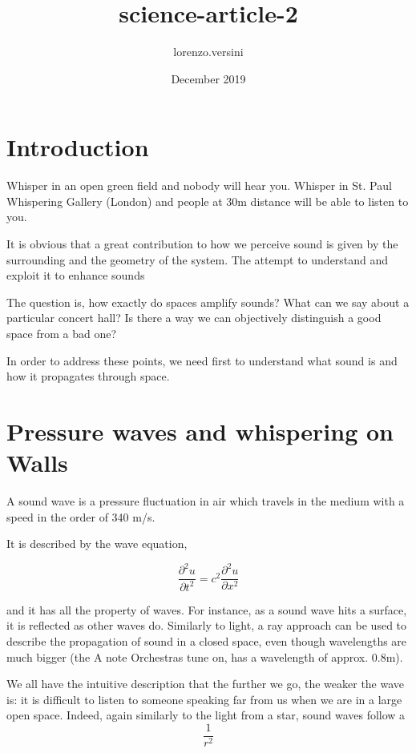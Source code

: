 \documentclass[draft ]{article}
\title{science-article-2}
\author{lorenzo.versini }
\date{December 2019}
\begin{document}
\twocolumn
\maketitle

\section{Introduction}


Whisper in an open green field and nobody will hear you. Whisper in St. Paul Whispering Gallery (London) and people at 30m distance will be able to listen to you.

It is obvious that a great contribution to how we perceive sound is given by the surrounding and the geometry of the system. The attempt to understand and exploit it to enhance sounds 

The question is, how exactly do spaces amplify sounds? What can we say about a particular concert hall? Is there a way we can objectively distinguish a good space from a bad one?

In order to address these points, we need first to understand what sound is and how it propagates through space.

\section{Pressure waves and whispering on Walls}

A sound wave is a pressure fluctuation in air \cite{book:university_physics} which travels in the medium with a speed in the order of 340 m/s.

It is described by the wave equation,

\begin{equation}
\frac{\partial^2 u}{\partial t^2} = c^2 \frac{\partial^2 u}{\partial x^2}
\end{equation}

and it has all the property of waves.
For instance, as a sound wave hits a surface, it is reflected as other waves do. Similarly to light, a ray approach can be used to describe the propagation of sound in a closed space, even though wavelengths are much bigger (the A note Orchestras tune on, has a wavelength of approx. 0.8m).

We all have the intuitive description that the further we go, the weaker the wave is: it is difficult to listen to someone speaking far from us when we are in a large open space.
Indeed, again similarly to the light from a star, sound waves follow a
\begin{equation}
\frac{1}{r^2}
\end{equation}
\end{document}
